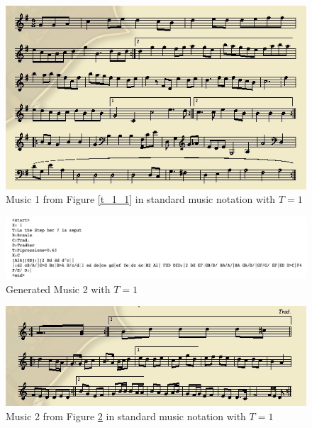 \documentclass{article}
\begin{document}
\begin{figure}[H]
\begin{center}
  \centering
  \includegraphics[width=4.5in]{image/t_1_1_nota.png}
\end{center}
\caption{Music 1 from Figure \ref{t_1_1} in standard music notation with $T=1$}
\label{t_1_nota_1}
\end{figure}

\begin{figure}[H]
\begin{center}
  \centering
  \includegraphics[width=5in]{image/t_1_2.png}
\end{center}
\caption{Generated Music 2 with $T=1$}
\label{t_1_2}
\end{figure}

\begin{figure}[H]
\begin{center}
  \centering
  \includegraphics[width=4.5in]{image/t_1_2_nota.png}
\end{center}
\caption{Music 2 from Figure \ref{t_1_2} in standard music notation with $T=1$}
\label{t_1_nota_2}
\end{figure}
\end{document}

